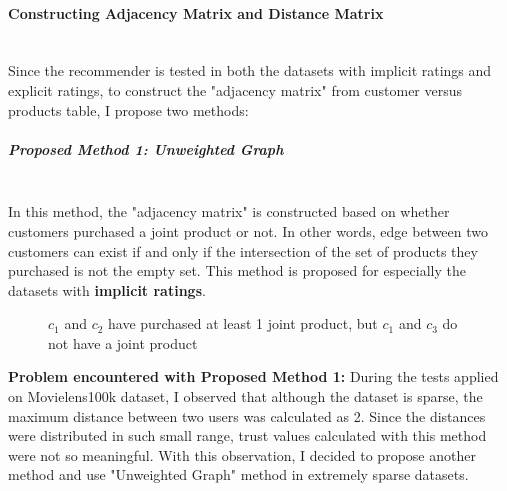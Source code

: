 	\paragraph{Constructing Adjacency Matrix and Distance Matrix}\mbox{}\\
	Since the recommender is tested in both the datasets with implicit ratings and explicit ratings, to construct the "adjacency matrix" from customer versus products table, I propose two methods: 
	\subparagraph{Proposed Method 1: Unweighted Graph}\mbox{}\\
	\label{prop_method_1}
	In this method, the "adjacency matrix" is constructed based on whether customers purchased a joint product or not. In other words, edge between two customers can exist if and only if the intersection of the set of products they purchased is not the empty set. This method is proposed for especially the datasets with \textbf{implicit ratings}.
	\begin{figure}[H]
		\centering
		\caption{$c_{1}$ and $c_{2}$ have purchased at least 1 joint product, but $c_{1}$ and $c_{3}$ do not have a joint product}
	\end{figure}

	\textbf{Problem encountered with Proposed Method 1:} During the tests applied on Movielens100k dataset, I observed that although the dataset is sparse, the maximum distance between two users was calculated as 2. Since the distances were distributed in such small range, trust values calculated with this method were not so meaningful. With this observation, I decided to propose another method and use "Unweighted Graph" method in extremely sparse datasets.
	
